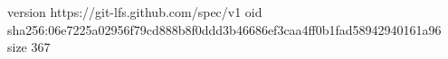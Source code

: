 version https://git-lfs.github.com/spec/v1
oid sha256:06e7225a02956f79cd888b8f0ddd3b46686ef3caa4ff0b1fad58942940161a96
size 367
